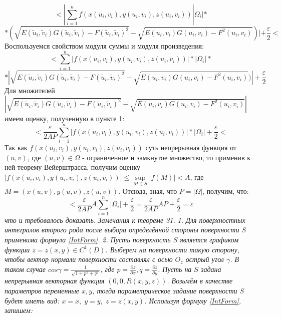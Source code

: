\documentclass[12pt,a4paper]{article}
\begin{document}
	\[ < | \sum\limits_{i=1}^n f(x(u_{i}, v_{i}),y(u_{i}, v_{i}),z(u_{i}, v_{i}))|\Omega_{i}| * \]
	\[ *(\sqrt{E(\tilde u_{i}, \tilde v_{i}) G(\tilde u_{i}, \tilde v_{i}) - F(\tilde u_{i}, \tilde v_{i})^2}  - \sqrt{E(u_{i},v_{i})G(u_{i},v_{i}) - F^2(u_{i},v_{i})})|+ \frac{\varepsilon}{2} <\]
	Воспользуемся свойством модуля суммы и модуля произведения:
	\[ < \sum\limits_{i=1}^n |f(x(u_{i}, v_{i}),y(u_{i}, v_{i}),z(u_{i}, v_{i}))|*|\Omega_{i}| * \]
	\[ *|\sqrt{E(\tilde u_{i}, \tilde v_{i}) G(\tilde u_{i}, \tilde v_{i}) - F(\tilde u_{i}, \tilde v_{i})^2}  - \sqrt{E(u_{i},v_{i})G(u_{i},v_{i}) - F^2(u_{i},v_{i})})|+ \frac{\varepsilon}{2}\]
	Для множителей $|\sqrt{E(\tilde u_{i}, \tilde v_{i}) G(\tilde u_{i}, \tilde v_{i}) - F(\tilde u_{i}, \tilde v_{i})^2}  - \sqrt{E(u_{i},v_{i})G(u_{i},v_{i}) - F^2(u_{i},v_{i})}|$ имеем оценку, полученную в пункте 1:
	\[ < \frac{\varepsilon}{2AP}\sum\limits_{i=1}^n |f(x(u_{i}, v_{i}),y(u_{i}, v_{i}),z(u_{i}, v_{i}))|*|\Omega_{i}| + \frac{\varepsilon}{2} <\]
	Так как $f(x(u_{i}, v_{i}),y(u_{i}, v_{i}),z(u_{i}, v_{i}))$ суть непрерывная функция от $(u,v)$, где $(u,v) \in \Omega$ - ограниченное и замкнутое множество, то применив к ней теорему Вейерштрасса, получим оценку $|f(x(u_{i}, v_{i}),y(u_{i}, v_{i}),z(u_{i}, v_{i}))| \leq \sup\limits_{M \in S}|f(M)| < A$, где $M = (x(u,v), y(u,v), z(u,v))$.
	\newline 
	Отсюда, зная, что $P = |\Omega|$, получим, что:
	\[ < \frac{\varepsilon}{2AP}A\sum\limits_{i=1}^n |\Omega_{i}| + \frac{\varepsilon}{2} = \frac{\varepsilon}{2AP}AP + \frac{\varepsilon}{2} = \varepsilon\] 
	\textit{что и требовалось доказать}.
	\newline
	\newline
	\textit{Замечания к теореме 31.}
	\newline
	\textit{1. Для поверхностных интегралов второго рода после выбора определённой стороны поверхности $S$ применима формула \eqref{IntForm}.}
	\newline
	\textit{2. Пусть поверхность $S$ является графиком функции $z = z(x,y) \in C^{1}(D)$. Выберем на поверхности такую сторону, чтобы вектор нормали поверхности составлял с осью $O_{z}$ острый угол $\gamma$. В таком случае $cos\gamma = \frac{1}{\sqrt{1 + p^{2} + q^{2}}}$, где $p = \frac{\partial z}{\partial x}, q = \frac{\partial z}{\partial y}$. Пусть на $S$ задана непрерывная векторная функция $(0,0,R(x,y,z))$. Возьмём в качестве параметров переменные $x, y$, тогда параметрическое задание поверхности $S$ будет иметь вид: $x = x, \; y = y, \; z = z(x,y)$. Используя формулу \eqref{IntForm}, запишем:}
\end{document}

